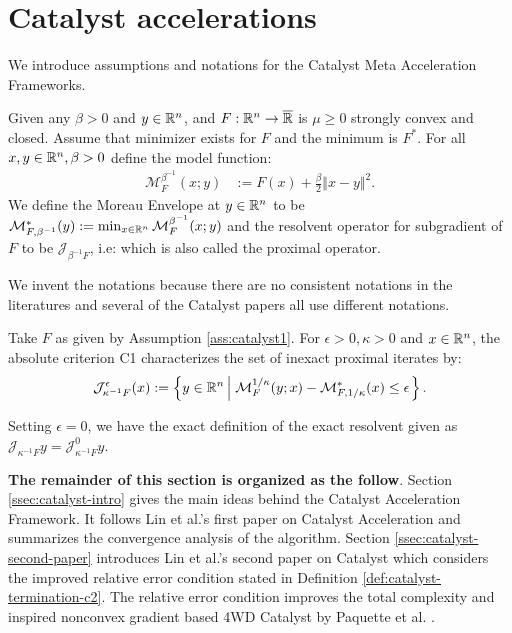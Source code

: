 \documentclass[12pt]{article}
\begin{document}
\section{Catalyst accelerations}\label{sec:catalyst}
    We introduce assumptions and notations for the Catalyst Meta Acceleration Frameworks. 
    \begin{assumption}\label{ass:catalyst1}
        Given any $\beta > 0$ and $y \in \mathbb R^n$, and $F: \mathbb R^n\rightarrow \overline {\mathbb R}$ is $\mu \ge 0$ strongly convex and closed. 
        Assume that minimizer exists for $F$ and the minimum is $F^*$. 
        For all $x,y\in \mathbb R^n, \beta > 0$ define the model function: 
        \begin{align*}
            \mathcal M^{\beta^{-1}}_F(x; y) &:= 
            F(x) + \frac{\beta}{2}\Vert x - y\Vert^2.
        \end{align*}
        We define the Moreau Envelope at $y \in \mathbb R^n$ to be $\mathcal M^*_{F,\beta^{-1}}(y) := \min_{x\in \mathbb R^n} \mathcal M_F^{\beta^{-1}}(x; y)$ and the resolvent operator for subgradient of $F$ to be $\mathcal J_{\beta^{-1}F}$, i.e: which is also called the proximal operator. 
        \par
        We invent the notations because there are no consistent notations in the literatures and several of the Catalyst papers all use different notations.  
    \end{assumption}
    \begin{definition}\label{def:catalyst-termination-c1}
        Take $F$ as given by Assumption \ref{ass:catalyst1}.
        For $\epsilon > 0, \kappa > 0$ and $x \in \mathbb R^n$, the absolute criterion C1 characterizes the set of inexact proximal iterates by: 
        \begin{align*}
            \mathcal J_{\kappa^{-1} F}^\epsilon (x) := 
            \left\lbrace
                y \in \mathbb R^n \left | \; 
                        \mathcal M^{1/\kappa}_F (y; x) - 
                        \mathcal M^*_{F, 1/\kappa}(x) \le \epsilon
                \right.
            \right\rbrace. 
        \end{align*}
    \end{definition}
    \begin{remark}
        Setting $\epsilon = 0$, we have the exact definition of the exact resolvent given as $\mathcal J_{\kappa^{-1}F}y = \mathcal J^0_{\kappa^{-1}F}y$. 
    \end{remark}
    \textbf{The remainder of this section is organized as the follow}. 
    Section \ref{ssec:catalyst-intro} gives the main ideas behind the Catalyst Acceleration Framework. 
    It follows Lin et al.'s first paper \cite{lin_universal_2015} on Catalyst Acceleration and summarizes the convergence analysis of the algorithm. 
    Section \ref{ssec:catalyst-second-paper} introduces Lin et al.'s second paper \cite{lin_catalyst_2018} on Catalyst which considers the improved relative error condition stated in Definition \ref{def:catalyst-termination-c2}. 
    The relative error condition improves the total complexity and inspired nonconvex gradient based 4WD Catalyst by Paquette et al. \cite{paquette_catalyst_2018}. 
    
\end{document}
